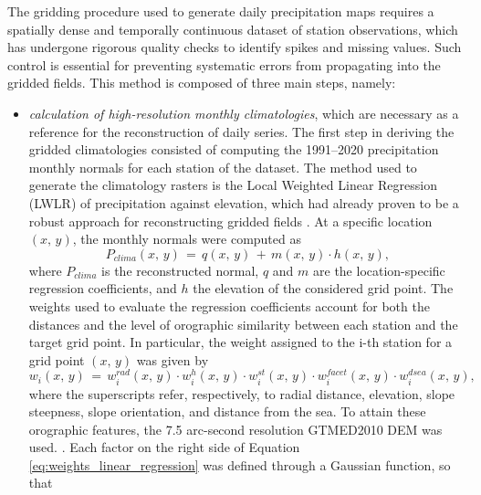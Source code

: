 The gridding procedure used to generate daily precipitation maps requires a spatially dense and temporally continuous dataset of station observations, 
which has undergone rigorous quality checks to identify spikes and missing values. Such control is essential for preventing systematic errors from 
propagating into the gridded fields. This method is composed of three main steps, namely:
\begin{itemize}[label=$\blacktriangleright$]
    \item \textit{calculation of high-resolution monthly climatologies}, which are necessary as a reference for the reconstruction of daily series. 
    The first step in deriving the gridded climatologies consisted of computing the 1991--2020 precipitation monthly normals for each station of the 
    dataset. The method used to generate the climatology rasters is the Local Weighted Linear Regression (LWLR) of precipitation against elevation, 
    which had already proven to be a robust approach for reconstructing gridded fields \parencite{LWLR_Crespi}. At a specific location 
    $\left(x,\,y\right)$, the monthly normals were computed as
    \begin{equation}
        P_{clima}\left(x,\,y\right)\,=\,q\left(x,\,y\right)\,+\,m\left(x,\,y\right) \cdot h\left(x,\,y\right),
        \label{eq:clima_precipitation_gridding}
    \end{equation}
    where $P_{clima}$ is the reconstructed normal, $q$ and $m$ are the location-specific regression coefficients, and $h$ the elevation of the considered 
    grid point.  The weights used to evaluate the regression coefficients account for both the distances and the level of orographic similarity between 
    each station and the target grid point. In particular, the weight assigned to the i-th station for a grid point $\left(x,\,y\right)$ was given by
    \begin{equation}
        w_i \left(x,\,y\right)\,=\,w_i^{rad}\left(x,\,y\right) \cdot w_i^{h}\left(x,\,y\right) \cdot w_i^{st}\left(x,\,y\right) \cdot w_i^{facet}\left(x,\,y\right) \cdot w_i^{dsea}\left(x,\,y\right),
        \label{eq:weights_linear_regression}
    \end{equation}  
    where the superscripts refer, respectively, to radial distance, elevation, slope steepness, slope orientation, and distance from the sea. To attain these 
    orographic features, the 7.5 arc-second resolution GTMED2010 DEM was used. \parencite{precipitation_IHGAR}. Each factor on the right side of Equation 
    \eqref{eq:weights_linear_regression} was defined through a Gaussian function, so that 

\end{itemize}
